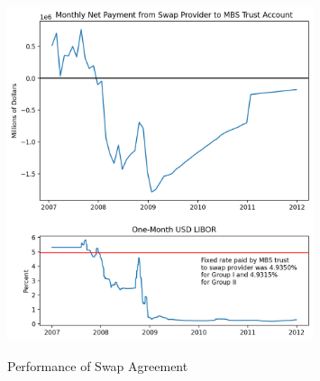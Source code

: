 \documentclass[12pt]{article}
\begin{document}
\begin{figure}[h]
	\centering
	\caption{Performance of Swap Agreement}
	\includegraphics[width=0.8\textwidth]{../figures/timeseries_swap_performance}
	\label{fig:timeseries_swap_performance}
\end{figure}
\end{document}
